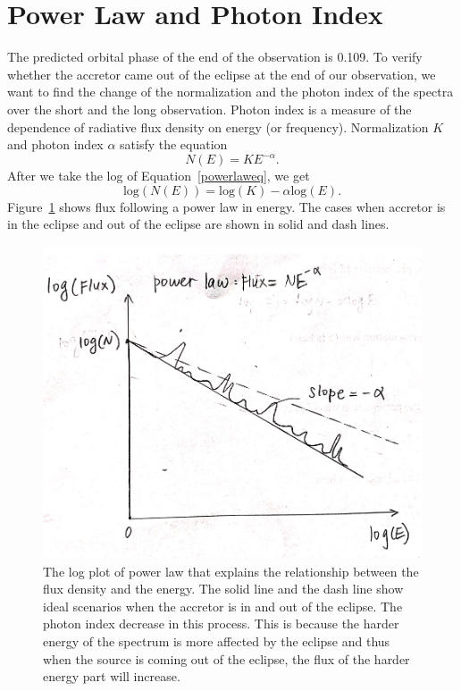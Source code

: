 \section{Power Law and Photon Index}

The predicted orbital phase of the end of the observation is 0.109. To verify whether the accretor came out of the eclipse at the end of our observation, we want to find the change of the normalization and the photon index of the spectra over the short and the long observation. Photon index is a measure of the dependence of radiative flux density on energy (or frequency). Normalization $K$ and photon index $\alpha$ satisfy the equation 
\begin{equation}
     N(E) = KE^{-\alpha}.
     \label{powerlaweq}
\end{equation}
After we take the log of Equation~\ref{powerlaweq}, we get 
\begin{equation}
     \mathrm{log}(N(E)) = \mathrm{log}(K) - \alpha \mathrm{log}(E).
     \label{powerlaweq}
\end{equation}
Figure~\ref{powerlaw} shows flux following a power law in energy. The cases when accretor is in the eclipse and out of the eclipse are shown in solid and dash lines.
\begin{figure}
    \centering
    \includegraphics[scale = 0.4]{Chapters/Figures/powerlaw_v2.png}
    \caption{The log plot of power law that explains the relationship between the flux density and the energy. The solid line and the dash line show ideal scenarios when the accretor is in and out of the eclipse. The photon index decrease in this process. This is because the harder energy of the spectrum is more affected by the eclipse and thus when the source is coming out of the eclipse, the flux of the harder energy part will increase.}
    \label{powerlaw}
\end{figure}
